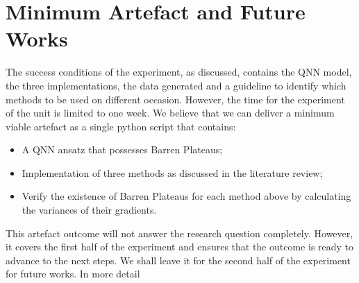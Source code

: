 \section{Minimum Artefact and Future Works}

The success conditions of the experiment, as discussed, contains the QNN model, the three implementations, the data generated and a guideline to identify which methods to be used on different occasion.
However, the time for the experiment of the unit is limited to one week. We believe that we can deliver a minimum viable artefact as a single python script that contains:
\begin{itemize}
    \item A QNN ansatz that possesses Barren Plateaus;
    \item Implementation of three methods as discussed in the literature review;
    \item Verify the existence of Barren Plateaus for each method above by calculating the variances of their gradients.
\end{itemize}

This artefact outcome will not answer the research question completely. 
However, it covers the first half of the experiment and ensures that the outcome is ready to advance to the next steps.
We shall leave it for the second half of the experiment for future works.
In more detail
